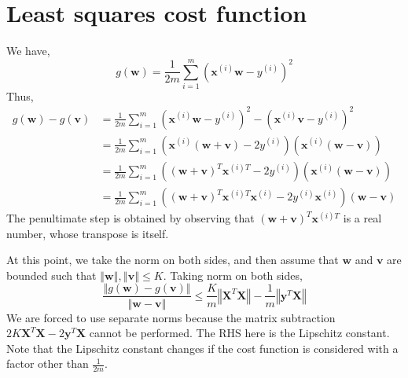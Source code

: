 \documentclass[sigconf,authordraft]{acmart}
\begin{document}
\section{Least squares cost function} \label{lstsq}
We have,
\[
    g(\textbf{w}) = \frac{1}{2m}\sum\limits_{i=1}^m \left(\textbf{x}^{(i)} \textbf{w} - y^{(i)}\right)^2
\]
Thus,
\[
    \begin{aligned}
        g(\textbf{w}) - g(\textbf{v}) &= \frac{1}{2m}\sum\limits_{i=1}^m \left(\textbf{x}^{(i)} \textbf{w} - y^{(i)}\right)^2 - \left(\textbf{x}^{(i)} \textbf{v} - y^{(i)}\right)^2 \\
        &= \frac{1}{2m}\sum\limits_{i=1}^m \left( \textbf{x}^{(i)}(\textbf{w}+\textbf{v}) - 2y^{(i)}\right) \left( \textbf{x}^{(i)} (\textbf{w}-\textbf{v}) \right) \\
        &= \frac{1}{2m}\sum\limits_{i=1}^m \left( (\textbf{w}+\textbf{v})^T \textbf{x}^{(i)T} - 2y^{(i)}\right) \left( \textbf{x}^{(i)} (\textbf{w}-\textbf{v}) \right) \\
        &= \frac{1}{2m}\sum\limits_{i=1}^m \left( (\textbf{w} + \textbf{v})^T \textbf{x}^{(i)T}\textbf{x}^{(i)} - 2y^{(i)}\textbf{x}^{(i)} \right) (\textbf{w}-\textbf{v}) 
    \end{aligned}
\]
The penultimate step is obtained by observing that $(\textbf{w}+\textbf{v})^T \textbf{x}^{(i)T}$ is a real number, whose transpose is itself.

At this point, we take the norm on both sides, and then assume that $\textbf{w}$ and $\textbf{v}$ are bounded such that $\left\Vert \textbf{w} \right\Vert, \left\Vert \textbf{v} \right\Vert \leq K$. Taking norm on both sides,
\[
    \boxed{
        \frac{\left\Vert g(\textbf{w}) - g(\textbf{v}) \right\Vert}{\left\Vert \textbf{w} - \textbf{v} \right\Vert} \leq \frac{K}{m}\left\Vert \textbf{X}^T\textbf{X} \right\Vert - \frac{1}{m} \left\Vert\textbf{y}^T \textbf{X} \right\Vert
    }
\]
We are forced to use separate norms because the matrix subtraction $2K \textbf{X}^T\textbf{X} - 2\textbf{y}^T \textbf{X}$ cannot be performed. 
The RHS here is the Lipschitz constant. Note that the Lipschitz constant changes if the cost function is considered with a factor other than $\frac{1}{2m}$.
\end{document}
